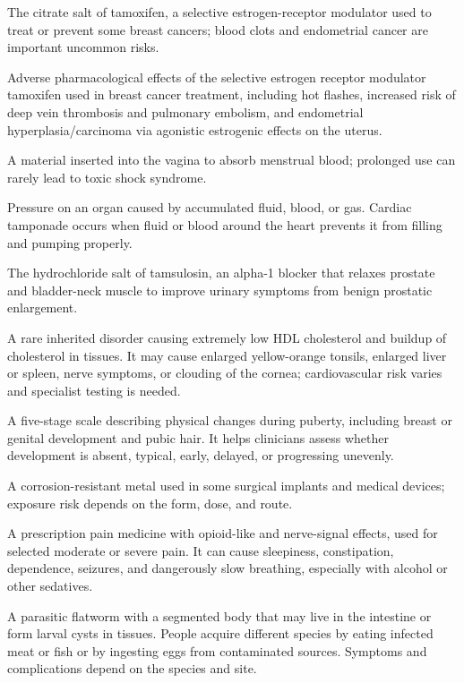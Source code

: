  The citrate salt of tamoxifen, a selective estrogen-receptor modulator used to treat or prevent some breast cancers; blood clots and endometrial cancer are important uncommon risks.

 Adverse pharmacological effects of the selective estrogen receptor modulator tamoxifen used in breast cancer treatment, including hot flashes, increased risk of deep vein thrombosis and pulmonary embolism, and endometrial hyperplasia/carcinoma via agonistic estrogenic effects on the uterus.

 A material inserted into the vagina to absorb menstrual blood; prolonged use can rarely lead to toxic shock syndrome.

 Pressure on an organ caused by accumulated fluid, blood, or gas. Cardiac tamponade occurs when fluid or blood around the heart prevents it from filling and pumping properly.

 The hydrochloride salt of tamsulosin, an alpha-1 blocker that relaxes prostate and bladder-neck muscle to improve urinary symptoms from benign prostatic enlargement.

 A rare inherited disorder causing extremely low HDL cholesterol and buildup of cholesterol in tissues. It may cause enlarged yellow-orange tonsils, enlarged liver or spleen, nerve symptoms, or clouding of the cornea; cardiovascular risk varies and specialist testing is needed.

 A five-stage scale describing physical changes during puberty, including breast or genital development and pubic hair. It helps clinicians assess whether development is absent, typical, early, delayed, or progressing unevenly.

 A corrosion-resistant metal used in some surgical implants and medical devices; exposure risk depends on the form, dose, and route.

 A prescription pain medicine with opioid-like and nerve-signal effects, used for selected moderate or severe pain. It can cause sleepiness, constipation, dependence, seizures, and dangerously slow breathing, especially with alcohol or other sedatives.

 A parasitic flatworm with a segmented body that may live in the intestine or form larval cysts in tissues.
People acquire different species by eating infected meat or fish or by ingesting eggs from
contaminated sources. Symptoms and complications depend on the species and site.

